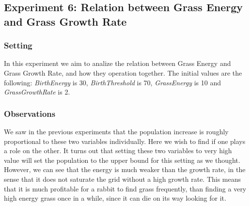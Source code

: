 \documentclass[11pt]{article}
\begin{document}
\subsection{Experiment 6: Relation between Grass Energy and Grass Growth Rate}

\subsubsection{Setting}
In this experiment we aim to analize the relation between Grass Energy and Grass Growth Rate, and how they operation together.
The initial values are the following: \textit{BirthEnergy} is 30, \textit{BirthThreshold} is 70, \textit{GrassEnergy} is 10 and \textit{GrassGrowthRate} is 2.

\subsubsection{Observations}
We saw in the previous experiments that the population increase is roughly proportional to these two variables individually. Here we wish to find if one plays a role on the other. It turns out that setting these two variables to very high value will set the population to the upper bound for this setting as we thought. However, we can see that the energy is much weaker than the growth rate, in the sense that it does not saturate the grid without a high growth rate. This means that it is much profitable for a rabbit to find grass frequently, than finding a very high energy grass once in a while, since it can die on its way looking for it.
\end{document}
